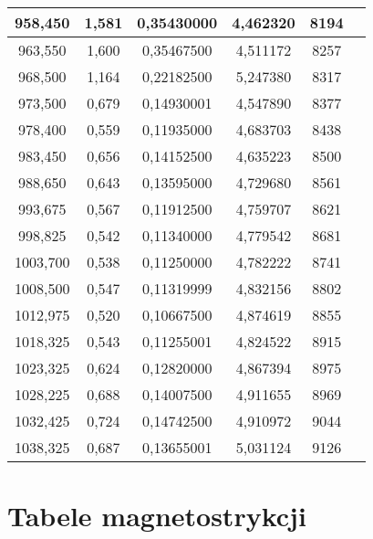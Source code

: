 \documentclass[a4paper,12pt]{article}
\numberwithin{equation}{section}
\begin{document}
\begin{appendices}
\begin{longtable}[c]{|c|c|c|c|c|c|}
958,450	&	 		1,581	&	 		0,35430000		 	&	4,462320	&	 		8194		\\\hline
963,550	&	 		1,600	&	 		0,35467500		 	&	4,511172	&	 		8257		\\\hline
968,500	&	 		1,164	&	 		0,22182500		 	&	5,247380	&	 		8317		\\\hline
973,500	&	 		0,679	&	 		0,14930001		 	&	4,547890	&	 		8377		\\\hline
978,400	&	 		0,559	&	 		0,11935000		 	&	4,683703	&	 		8438		\\\hline
983,450	&	 		0,656	&	 		0,14152500		 	&	4,635223	&	 		8500		\\\hline
988,650	&	 		0,643	&	 		0,13595000		 	&	4,729680	&	 		8561		\\\hline
993,675	&	 		0,567	&	 		0,11912500		 	&	4,759707	&	 		8621		\\\hline
998,825	&	 		0,542	&	 		0,11340000		 	&	4,779542	&	 		8681		\\\hline
1003,700	&	 		0,538	&	 		0,11250000		 	&	4,782222	&	 		8741		\\\hline
1008,500	&	 		0,547	&	 		0,11319999		 	&	4,832156	&	 		8802		\\\hline
1012,975	&	 		0,520	&	 		0,10667500		 	&	4,874619	&	 		8855		\\\hline
1018,325	&	 		0,543	&	 		0,11255001		 	&	4,824522	&	 		8915		\\\hline
1023,325	&	 		0,624	&	 		0,12820000		 	&	4,867394	&	 		8975		\\\hline
1028,225	&	 		0,688	&	 		0,14007500		 	&	4,911655	&	 		8969		\\\hline
1032,425	&	 		0,724	&	 		0,14742500		 	&	4,910972	&	 		9044		\\\hline
1038,325	&	 		0,687	&	 		0,13655001		 	&	5,031124	&	 		9126		\\\hline

\end{longtable}
\clearpage
\section{Tabele magnetostrykcji}


\end{appendices}
\end{document}
